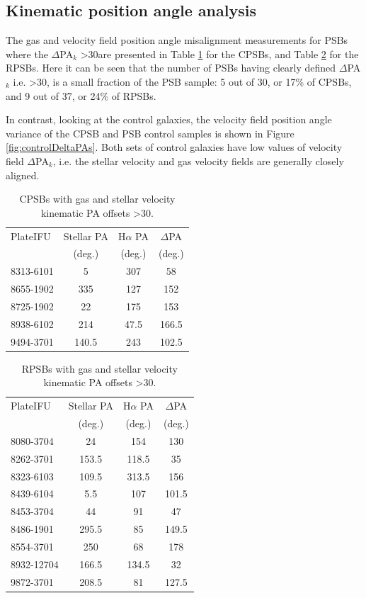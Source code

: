 \subsection{Kinematic position angle analysis}
\label{PA-misalignment}
The gas and velocity field position angle misalignment measurements for PSBs where the $\Delta$PA$_{k}$ \textgreater 30\textdegree are presented in Table \ref{tab:offsetCPSBs} for the CPSBs, and Table \ref{tab:offsetRPSBs} for the RPSBs. Here it can be seen that the number of PSBs having clearly defined $\Delta$PA$_{k}$ i.e. \textgreater 30\textdegree, is a small fraction of the PSB sample: 5 out of 30, or 17\% of CPSBs, and 9 out of 37, or 24\% of RPSBs. 

In contrast, looking at the control galaxies, the velocity field position angle variance of the CPSB and PSB control samples is shown in Figure \ref{fig:controlDeltaPAs}. Both sets of control galaxies have low values of velocity field $\Delta$PA$_{k}$, i.e. the stellar velocity and gas velocity fields are generally closely aligned.

\begin{table}
\centering
\caption{CPSBs with gas and stellar velocity kinematic PA offsets \textgreater 30\textdegree.}
\label{tab:offsetCPSBs}
\begin{tabular}{lccc}
\hline
PlateIFU  & Stellar PA & H$\alpha$ PA & $\Delta$PA \\
  & (deg.) & (deg.) & (deg.) \\
\hline
8313-6101 & 5 & 307 & 58 \\
8655-1902 & 335 & 127 & 152 \\
8725-1902 & 22 & 175 & 153 \\
8938-6102 & 214 & 47.5 & 166.5 \\
9494-3701 & 140.5 & 243 & 102.5 \\
\hline
\end{tabular}
\end{table}

\begin{table}
\centering
\caption[RPSBs with kinematic velocity PA offsets \textgreater 30\textdegree.]{RPSBs with gas and stellar velocity kinematic PA offsets \textgreater 30\textdegree.}
\label{tab:offsetRPSBs}
\begin{tabular}{lccc}
\hline
PlateIFU   & Stellar PA & H$\alpha$ PA & $\Delta$PA \\
  & (deg.) & (deg.) & (deg.) \\
\hline
8080-3704 & 24 & 154 & 130 \\
8262-3701 & 153.5 & 118.5 & 35 \\
8323-6103 & 109.5 & 313.5 & 156 \\
8439-6104 & 5.5 & 107 & 101.5 \\
8453-3704 & 44 & 91 & 47 \\
8486-1901 & 295.5 & 85 & 149.5 \\
8554-3701 & 250 & 68 & 178 \\
8932-12704 & 166.5 & 134.5 & 32 \\
9872-3701 & 208.5 & 81 & 127.5 \\
\hline
\end{tabular}
\end{table}


